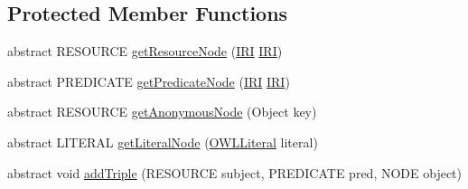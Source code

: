 \subsection*{Protected Member Functions}
\begin{DoxyCompactItemize}
\item 
abstract R\-E\-S\-O\-U\-R\-C\-E \hyperlink{classorg_1_1coode_1_1owlapi_1_1rdf_1_1model_1_1_abstract_translator_3_01_n_o_d_e_00_01_r_e_s_o_ubc597564c2cb8c8d2b0139cb32f3f91c_ad0bdd1396b956340279a519918d457d1}{get\-Resource\-Node} (\hyperlink{classorg_1_1semanticweb_1_1owlapi_1_1model_1_1_i_r_i}{I\-R\-I} \hyperlink{classorg_1_1semanticweb_1_1owlapi_1_1model_1_1_i_r_i}{I\-R\-I})
\item 
abstract P\-R\-E\-D\-I\-C\-A\-T\-E \hyperlink{classorg_1_1coode_1_1owlapi_1_1rdf_1_1model_1_1_abstract_translator_3_01_n_o_d_e_00_01_r_e_s_o_ubc597564c2cb8c8d2b0139cb32f3f91c_a0bd3dc4745b05331c18af0359f97e579}{get\-Predicate\-Node} (\hyperlink{classorg_1_1semanticweb_1_1owlapi_1_1model_1_1_i_r_i}{I\-R\-I} \hyperlink{classorg_1_1semanticweb_1_1owlapi_1_1model_1_1_i_r_i}{I\-R\-I})
\item 
abstract R\-E\-S\-O\-U\-R\-C\-E \hyperlink{classorg_1_1coode_1_1owlapi_1_1rdf_1_1model_1_1_abstract_translator_3_01_n_o_d_e_00_01_r_e_s_o_ubc597564c2cb8c8d2b0139cb32f3f91c_af85afbf4a9f810f1c7673046fb7e2e0e}{get\-Anonymous\-Node} (Object key)
\item 
abstract L\-I\-T\-E\-R\-A\-L \hyperlink{classorg_1_1coode_1_1owlapi_1_1rdf_1_1model_1_1_abstract_translator_3_01_n_o_d_e_00_01_r_e_s_o_ubc597564c2cb8c8d2b0139cb32f3f91c_ace6d2df95c12e2a71c0ce89efdabde1a}{get\-Literal\-Node} (\hyperlink{interfaceorg_1_1semanticweb_1_1owlapi_1_1model_1_1_o_w_l_literal}{O\-W\-L\-Literal} literal)
\item 
abstract void \hyperlink{classorg_1_1coode_1_1owlapi_1_1rdf_1_1model_1_1_abstract_translator_3_01_n_o_d_e_00_01_r_e_s_o_ubc597564c2cb8c8d2b0139cb32f3f91c_abcaf7a2412a0cfb9b617883fdece9da3}{add\-Triple} (R\-E\-S\-O\-U\-R\-C\-E subject, P\-R\-E\-D\-I\-C\-A\-T\-E pred, N\-O\-D\-E object)
\end{DoxyCompactItemize}
